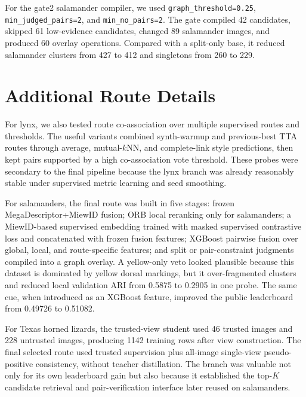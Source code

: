 \documentclass{ceurart}
\newcommand{\method}[1]{\texttt{#1}}
\begin{document}
For the gate2 salamander compiler, we used \method{graph\_threshold=0.25}, \method{min\_judged\_pairs=2}, and \method{min\_no\_pairs=2}. The gate compiled 42 candidates, skipped 61 low-evidence candidates, changed 89 salamander images, and produced 60 overlay operations. Compared with a split-only base, it reduced salamander clusters from 427 to 412 and singletons from 260 to 229.

\section{Additional Route Details}
\label{app:route-details}
For lynx, we also tested route co-association over multiple supervised routes and thresholds. The useful variants combined synth-warmup and previous-best TTA routes through average, mutual-$k$NN, and complete-link style predictions, then kept pairs supported by a high co-association vote threshold. These probes were secondary to the final pipeline because the lynx branch was already reasonably stable under supervised metric learning and seed smoothing.

For salamanders, the final route was built in five stages: frozen MegaDescriptor+MiewID fusion; ORB local reranking only for salamanders; a MiewID-based supervised embedding trained with masked supervised contrastive loss and concatenated with frozen fusion features; XGBoost pairwise fusion over global, local, and route-specific features; and split or pair-constraint judgments compiled into a graph overlay. A yellow-only veto looked plausible because this dataset is dominated by yellow dorsal markings, but it over-fragmented clusters and reduced local validation ARI from 0.5875 to 0.2905 in one probe. The same cue, when introduced as an XGBoost feature, improved the public leaderboard from 0.49726 to 0.51082.

For Texas horned lizards, the trusted-view student used 46 trusted images and 228 untrusted images, producing 1142 training rows after view construction. The final selected route used trusted supervision plus all-image single-view pseudo-positive consistency, without teacher distillation. The branch was valuable not only for its own leaderboard gain but also because it established the top-$K$ candidate retrieval and pair-verification interface later reused on salamanders.
\end{document}
